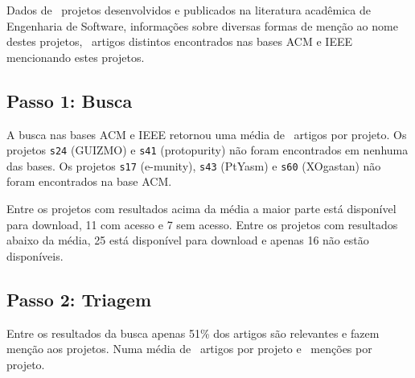 Dados de \SoftwareCount \ projetos desenvolvidos e publicados na literatura
acadêmica de Engenharia de Software, informações sobre diversas formas de
menção ao nome destes projetos, \ScreeningUniqueCount \ artigos distintos
encontrados nas bases ACM e IEEE mencionando estes projetos.

\subsection{Passo 1: Busca}

A busca nas bases ACM e IEEE retornou uma média de \SearchUniqueMean \ artigos
por projeto. Os projetos \texttt{s24} (GUIZMO) e \texttt{s41} (protopurity)
não foram encontrados em nenhuma das bases.
Os projetos \texttt{s17} (e-munity), \texttt{s43} (PtYasm) e \texttt{s60} (XOgastan)
não foram encontrados na base ACM.

Entre os projetos com resultados acima da média a maior parte está disponível
para download, 11 com acesso e 7 sem acesso.  Entre os projetos com resultados
abaixo da média, 25 está disponível para download e apenas 16 não estão
disponíveis.



\subsection{Passo 2: Triagem}

Entre os resultados da busca apenas 51\% dos artigos são relevantes e fazem
menção aos projetos. Numa média de \ScreeningUniqueMean \ artigos por projeto
e \ScreeningMean \ menções por projeto.

